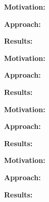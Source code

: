\vspace{3mm}
\noindent\rqi
\vspace{3mm}

\noindent \textbf{Motivation:} 

\vspace{1mm}
\noindent \textbf{Approach:} 

\vspace{1mm}
\noindent \textbf{Results:} 

\conclusionbox{}

\vspace{3mm}
\noindent\rqii
\vspace{3mm}

\noindent \textbf{Motivation:} 

\vspace{1mm}
\noindent \textbf{Approach:} 

\vspace{1mm}
\noindent \textbf{Results:} 

\conclusionbox{}

\vspace{3mm}
\noindent\rqiii
\vspace{3mm}

\noindent \textbf{Motivation:} 

\vspace{1mm}
\noindent \textbf{Approach:} 

\vspace{1mm}
\noindent \textbf{Results:} 

\conclusionbox{}

\vspace{3mm}
\noindent\rqiv
\vspace{3mm}

\noindent \textbf{Motivation:} 

\vspace{1mm}
\noindent \textbf{Approach:} 

\vspace{1mm}
\noindent \textbf{Results:} 

\conclusionbox{}